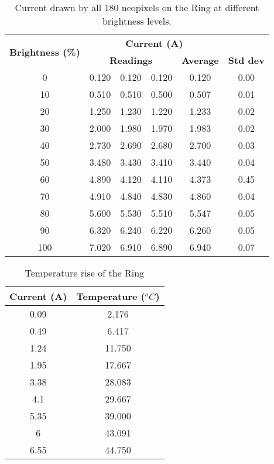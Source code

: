 \begin{table}[h!]
	\centering
	\caption{Current drawn by all 180 neopixels on the Ring at different brightness levels.}
	\label{table:current_180_neopixels}
	\begin{tabular}{cccccc}
		\hline
		\hline
		\toprule
		\multirow{2}{*}{\textbf{Brightness (\%)}} & \multicolumn{4}{c}{\textbf{Current (A)}}\\
		& \multicolumn{3}{c}{\textbf{Readings}} & \textbf{Average} & \textbf{Std dev} \\
		\bottomrule
		\toprule
		0	&	0.120	&	0.120	&	0.120	&	0.120	&	0.00	\\
		10	&	0.510	&	0.510	&	0.500	&	0.507	&	0.01	\\
		20	&	1.250	&	1.230	&	1.220	&	1.233	&	0.02	\\
		30	&	2.000	&	1.980	&	1.970	&	1.983	&	0.02	\\
		40	&	2.730	&	2.690	&	2.680	&	2.700	&	0.03	\\
		50	&	3.480	&	3.430	&	3.410	&	3.440	&	0.04	\\
		60	&	4.890	&	4.120	&	4.110	&	4.373	&	0.45	\\
		70	&	4.910	&	4.840	&	4.830	&	4.860	&	0.04	\\
		80	&	5.600	&	5.530	&	5.510	&	5.547	&	0.05	\\
		90	&	6.320	&	6.240	&	6.220	&	6.260	&	0.05	\\
		100	&	7.020	&	6.910	&	6.890	&	6.940	&	0.07	\\
		\bottomrule
		\hline
		\hline
	\end{tabular}
\end{table}				

\begin{table}[h!]
	\centering
	\caption{Temperature rise of the Ring}
	\label{table:temperature_ring}
	\begin{tabular}{cc}
		\hline
		\hline
		\toprule
		\textbf{Current (A)} & \textbf{Temperature ($^oC$)}\\
		\bottomrule
		\toprule
		0.09    &    2.176    \\
		0.49    &    6.417    \\
		1.24    &    11.750    \\
		1.95    &    17.667    \\
		3.38    &    28.083    \\
		4.1        &    29.667    \\
		5.35    &    39.000    \\
		6        &    43.091    \\
		6.55    &    44.750    \\
		\bottomrule
		\hline
		\hline
	\end{tabular}
\end{table}

